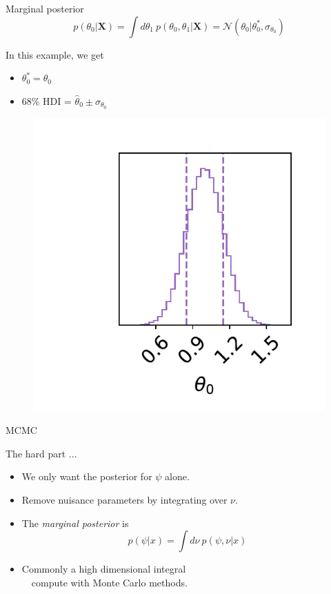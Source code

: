 \documentclass[
aspectratio=169,
14pt,
professionalfonts
]{beamer}
\newcommand{\arrow}{~\ding{220}~}
\begin{document}
\begin{frame}{Marginal posterior}
\vspace{-1cm}
    $$p(\theta_0|\boldsymbol{X}) = \int d\theta_1 ~ p(\theta_0, \theta_1|\boldsymbol{X}) = \mathcal{N}(\theta_0 | \theta_0^*, \sigma_{\theta_0})$$
    \begin{minipage}{0.4\linewidth}
    In this example, we get
        \begin{itemize}
            \item $\theta_0^* = \hat \theta_0$
            \item 68\% HDI = $\hat \theta_0 \pm \sigma_{\theta_0}$
        \end{itemize}
    \end{minipage}
    \begin{minipage}{0.59\linewidth}
    \begin{figure}
        \centering
        \includegraphics[width=0.7\linewidth]{../plots/marginal_posterior.pdf}
    \end{figure}
    \end{minipage}
\end{frame}

\begin{frame}
\center
\Large
MCMC
\end{frame}

\begin{frame}{The hard part ...}
\begin{itemize}
    \item We only want the posterior for $\psi$ alone.
    \item Remove nuisance parameters by integrating over $\nu$.
    \item[\arrow] The \textit{marginal posterior} is
        $$
        p(\psi | x) = \int d\nu ~ p(\psi, \nu | x)
        $$
    \item Commonly a high dimensional integral\\ \arrow compute with Monte Carlo methods.
\end{itemize}
\end{frame}
\end{document}

